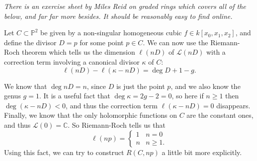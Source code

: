 \documentclass[10pt,notitlepage]{article}
\numberwithin{equation}{subsection}
\newcommand{\pee}{\mathbb{P}}
\newcommand{\cc}{\mathbb{C}}
\begin{document}
        \begin{example}\label{ex:elliptic-first}
            \emph{There is an exercise sheet \cite{Reid:5t8DB_-1} by Miles Reid on graded rings which covers all of the below, and far far more besides.
            It should be reasonably easy to find online.}

            Let $C\subset\pee^2$ be given by a non-singular homogeneous cubic $f\in k[x_0,x_1,x_2]$, and define the divisor $D=p$ for some point $p\in C$.
            We can now use the Riemann-Roch theorem which tells us the dimension $\ell(nD)$ of $\mathcal{L}(nD)$ with a correction term involving a canonical divisor $\kappa$ of $C$:
            \[
                \ell(nD) - \ell(\kappa-nD) = \deg D + 1 - g.
            \]

            We know that $\deg nD = n$, since $D$ is just the point $p$, and we also know the genus $g=1$.
            It is a useful fact that $\deg\kappa=2g-2=0$, so here if $n\geqslant1$ then $\deg(\kappa-nD)<0$, and thus the correction term $\ell(\kappa-nD)=0$ disappears.
            Finally, we know that the only holomorphic functions on $C$ are the constant ones, and thus $\mathcal{L}(0)=\cc$.
            So Riemann-Roch tells us that
            \begin{equation}\label{eqn:riemann-roch-example}
                \ell(np) =
                \begin{cases}
                    1 & n=0\\
                    n & n\geqslant1.
                \end{cases}
            \end{equation}
            Using this fact, we can try to construct $R(C,np)$ a little bit more explicitly.

            \bigskip


\end{example}
\end{document}
